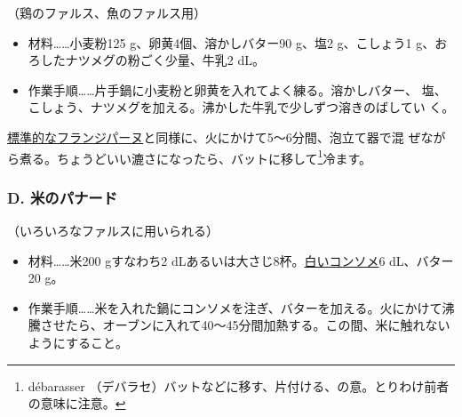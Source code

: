 \begin{recette}

（鶏のファルス、魚のファルス用）

\begin{itemize}
\item
  材料\ldots{}\ldots{}小麦粉125 g、卵黄4個、溶かしバター90 g、塩2
  g、こしょう1 g、おろしたナツメグの粉ごく少量、牛乳2\undemi{} dL。
\item
  作業手順\ldots{}\ldots{}片手鍋に小麦粉と卵黄を入れてよく練る。溶かしバター、
  塩、こしょう、ナツメグを加える。沸かした牛乳で少しずつ溶きのばしてい
  く。
\end{itemize}

\protect\hyperlink{creme-frangipane}{標準的なフランジパーヌ}と同様に、火にかけて5〜6分間、泡立て器で混
ぜながら煮る。ちょうどいい漉さになったら、バットに移して\footnote{débarasser
  （デバラセ）バットなどに移す、片付ける、の意。とりわけ前者の意味に注意。}冷ます。

\hypertarget{panade-d}{%
\subsubsection{D. 米のパナード}\label{panade-d}}



（いろいろなファルスに用いられる）

\begin{itemize}
\item
  材料\ldots{}\ldots{}米200 gすなわち2
  dLあるいは大さじ8杯。\protect\hyperlink{}{白いコンソメ}6 dL、バター20
  g。
\item
  作業手順\ldots{}\ldots{}米を入れた鍋にコンソメを注ぎ、バターを加える。火にかけて沸騰させたら、オーブンに入れて40〜45分間加熱する。この間、米に触れないようにすること。
\end{itemize}


\end{recette}
